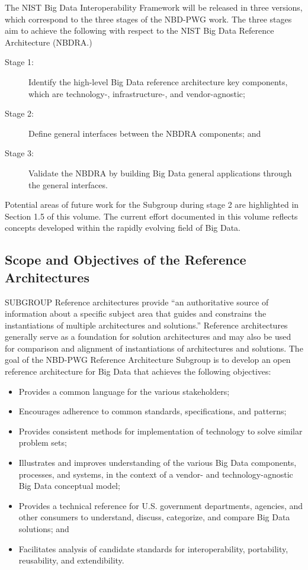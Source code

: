 \documentclass[11pt]{article}
\begin{document}
The NIST Big Data Interoperability Framework will be released in three versions, which correspond to 
the three stages of the NBD-PWG work. The three stages aim to achieve the following with respect to the 
NIST Big Data Reference Architecture (NBDRA.)
\begin{description}
\item[Stage 1:]	 Identify the high-level Big Data reference architecture key components, which are 
technology-, infrastructure-, and vendor-agnostic;
\item[Stage 2:]	 Define general interfaces between the NBDRA components; and
\item[Stage 3:]	 Validate the NBDRA by building Big Data general applications through the general 
interfaces.
\end{description}
Potential areas of future work for the Subgroup during stage 2 are highlighted in Section 1.5 of this 
volume. The current effort documented in this volume reflects concepts developed within the rapidly 
evolving field of Big Data.

\subsection{Scope and Objectives of the Reference Architectures }

SUBGROUP
Reference architectures provide “an authoritative source of information about a specific subject area that 
guides and constrains the instantiations of multiple architectures and solutions.”   Reference architectures 
generally serve as a foundation for solution architectures and may also be used for comparison and 
alignment of instantiations of architectures and solutions. 
The goal of the NBD-PWG Reference Architecture Subgroup is to develop an open reference architecture 
for Big Data that achieves the following objectives:

\begin{itemize}
\item	Provides a common language for the various stakeholders;
\item	Encourages adherence to common standards, specifications, and patterns;
\item	Provides consistent methods for implementation of technology to solve similar problem sets;
\item	Illustrates and improves understanding of the various Big Data components, processes, and 
systems, in the context of a vendor- and technology-agnostic Big Data conceptual model; 
\item	Provides a technical reference for U.S. government departments, agencies, and other consumers 
to understand, discuss, categorize, and compare Big Data solutions; and 
\item	Facilitates analysis of candidate standards for interoperability, portability, reusability, and 
extendibility.
\end{itemize}
\end{document}
